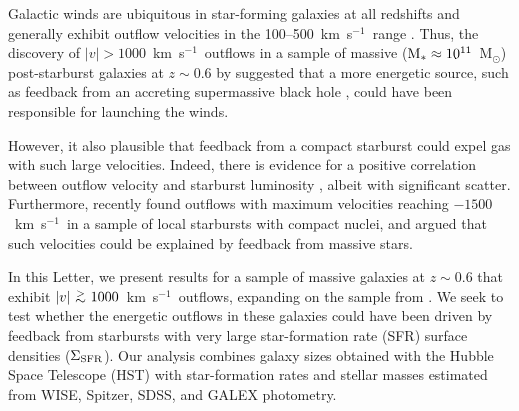 \documentclass[apj]{emulateapj}
\newcommand{\kms}{km~s$^{-1}$}
\newcommand{\msun}{M$_{\odot}$}
\newcommand{\mstar}{M$_{*}$}
\newcommand{\sigmasfr}{\Sigma_{\textnormal{\scriptsize{SFR}}}}
\newcommand {\apgt} {\ {\raise-.5ex\hbox{$\buildrel>\over\sim$}}\ }
\begin{document}

Galactic winds are ubiquitous in star-forming galaxies at all
redshifts and generally exhibit outflow velocities in the
100--500~\kms\ range
\citep[e.g.,][]{hec00,sha03,mar05,rup05,wei09,rub10,ste10}.  Thus, the
discovery of $|v|>1000$~\kms\ outflows in a sample of massive
($\textnormal{\mstar}\approx10^{11}$~\msun) post-starburst galaxies at
$z\sim0.6$ by \citet{tre07} suggested that a more energetic source,
such as feedback from an accreting supermassive black hole
\citep[e.g.,][]{sil98,dim05,deb12}, could have been responsible for
launching the winds.

However, it also plausible that feedback from a compact starburst
could expel gas with such large velocities.  Indeed, there is evidence
for a positive correlation between outflow velocity and starburst
luminosity \citep[e.g.,][]{mar05,rup05,tre07}, albeit with significant
scatter.  Furthermore, \citet{hec11} recently found outflows with
maximum velocities reaching $-1500$~\kms\ in a sample of local
starbursts with compact nuclei, and argued that such velocities could
be explained by feedback from massive stars.


In this Letter, we present results for a sample of massive galaxies at
$z\sim0.6$ that exhibit $|v|\apgt1000$~\kms\ outflows, expanding on
the sample from \citet{tre07}.  We seek to test whether the energetic
outflows in these galaxies could have been driven by feedback from
starbursts with very large star-formation rate (SFR) surface densities
($\sigmasfr$).  Our analysis combines galaxy sizes obtained with the
Hubble Space Telescope (HST) with star-formation rates and stellar
masses estimated from WISE, Spitzer, SDSS, and GALEX photometry.

\end{document}
